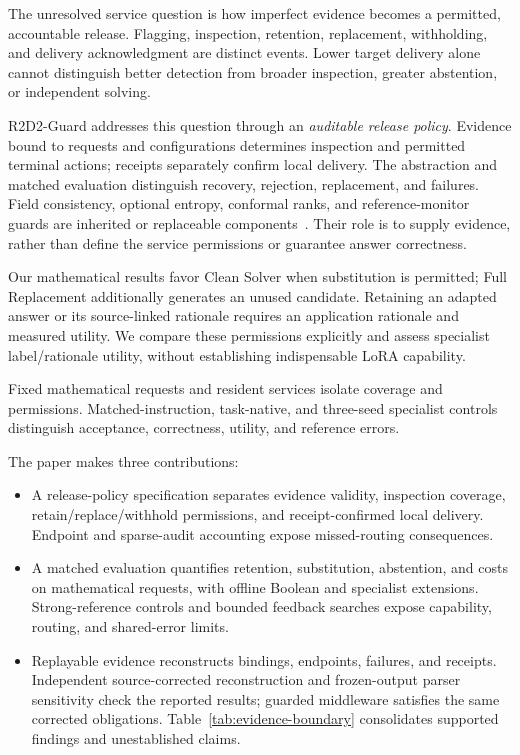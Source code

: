 \documentclass[journal]{IEEEtran}
\begin{document}
The unresolved service question is how imperfect evidence becomes a permitted, accountable release. Flagging, inspection, retention, replacement, withholding, and delivery acknowledgment are distinct events. Lower target delivery alone cannot distinguish better detection from broader inspection, greater abstention, or independent solving.

R2D2-Guard addresses this question through an \emph{auditable release policy}. Evidence bound to requests and configurations determines inspection and permitted terminal actions; receipts separately confirm local delivery. The abstraction and matched evaluation distinguish recovery, rejection, replacement, and failures. Field consistency, optional entropy, conformal ranks, and reference-monitor guards are inherited or replaceable components~\cite{li2024chain,saltzer1975protection,schneider2000enforceable}. Their role is to supply evidence, rather than define the service permissions or guarantee answer correctness.

Our mathematical results favor Clean Solver when substitution is permitted; Full Replacement additionally generates an unused candidate. Retaining an adapted answer or its source-linked rationale requires an application rationale and measured utility. We compare these permissions explicitly and assess specialist label/rationale utility, without establishing indispensable LoRA capability.

Fixed mathematical requests and resident services isolate coverage and permissions. Matched-instruction, task-native, and three-seed specialist controls distinguish acceptance, correctness, utility, and reference errors.

The paper makes three contributions:
\begin{itemize}
\item A release-policy specification separates evidence validity, inspection coverage, retain/replace/withhold permissions, and receipt-confirmed local delivery. Endpoint and sparse-audit accounting expose missed-routing consequences.
\item A matched evaluation quantifies retention, substitution, abstention, and costs on mathematical requests, with offline Boolean and specialist extensions. Strong-reference controls and bounded feedback searches expose capability, routing, and shared-error limits.
\item Replayable evidence reconstructs bindings, endpoints, failures, and receipts. Independent source-corrected reconstruction and frozen-output parser sensitivity check the reported results; guarded middleware satisfies the same corrected obligations. Table~\ref{tab:evidence-boundary} consolidates supported findings and unestablished claims.
\end{itemize}
\end{document}
